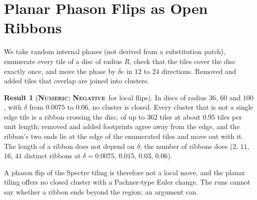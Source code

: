\documentclass[11pt]{article}
\newcommand{\numeric}{\textbf{\textsc{Numeric}}}
\newcommand{\negres}{\textbf{\textsc{Negative}}}
\theoremstyle{definition}
\newtheorem{result}{Result}
\begin{document}
\section{Planar Phason Flips as Open Ribbons}
\label{sec:plane}
We take random internal phases (not derived from a substitution patch), enumerate every tile of a disc of radius $R$, check that the tiles cover the disc exactly once, and move the phase by $\delta e$ in $12$ to $24$ directions. Removed and added tiles that overlap are joined into clusters.
\begin{result}[\numeric; \negres\ for local flips]\label{res:ribbon}
In discs of radius $36$, $60$ and $100$, with $\delta$ from $0.0075$ to $0.06$, no cluster is closed. Every cluster that is not a single edge tile is a ribbon crossing the disc, of up to $362$ tiles at about $0.95$ tiles per unit length; removed and added footprints agree away from the edge, and the ribbon's two ends lie at the edge of the enumerated tiles and move out with it. The length of a ribbon does not depend on $\delta$; the number of ribbons does ($2$, $11$, $16$, $41$ distinct ribbons at $\delta=0.0075$, $0.015$, $0.03$, $0.06$).
\end{result}
A phason flip of the Spectre tiling is therefore not a local move, and the planar tiling offers no closed cluster with a Pachner-type Euler change. The runs cannot say whether a ribbon ends beyond the region; an argument can.
\end{document}
